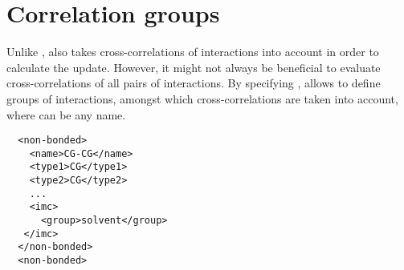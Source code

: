 \section{Correlation groups}
Unlike \ibi, \imc also takes cross-correlations of interactions into account in order to calculate the update. However, it might not always be beneficial to evaluate cross-correlations of all pairs of interactions. By specifying , \votca allows to define groups of interactions, amongst which cross-correlations are taken into account, where  can be any name.

\begin{lstlisting}
  <non-bonded>
    <name>CG-CG</name>
    <type1>CG</type1>
    <type2>CG</type2>
    ...
    <imc>
      <group>solvent</group>
   </imc>
  </non-bonded>
  <non-bonded>
\end{lstlisting}
